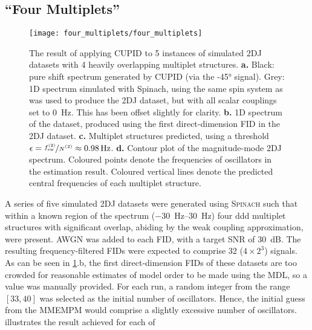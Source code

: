 \subsection{``Four Multiplets''}
\label{subsec:four-mp}
\begin{figure}
    \centering
    \texttt{[image: four\_multiplets/four\_multiplets]}
    \caption[
        The result of applying \acs{CUPID} to 5 instances of simulated
        \acs{2DJ} datasets with 4 heavily overlapping multiplet structures.
    ]{
        The result of applying \ac{CUPID} to 5 instances of simulated \ac{2DJ}
        datasets with 4 heavily overlapping multiplet structures.
        \textbf{a.} Black: pure shift spectrum generated by \ac{CUPID} (via the
        \ang{-45} signal).
        Grey: \ac{1D} spectrum simulated with Spinach, using the same spin
        system as was used to produce the \ac{2DJ} dataset, but with all scalar
        couplings set to \qty{0}{\hertz}. This has been offset slightly for
        clarity.
        \textbf{b.} \ac{1D} spectrum of the dataset, produced using the first
        direct-dimension \ac{FID} in the \ac{2DJ} dataset.
        \textbf{c.} Multiplet structures predicted, using a threshold $\epsilon
        = \nicefrac{\fswtwo}{\Ntwo} \approx \qty{0.98}{\hertz}$.
        \textbf{d.} Contour plot of the magnitude-mode \ac{2DJ} spectrum.
        Coloured points denote the frequencies of oscillators in the
        estimation result. Coloured vertical lines denote the predicted central
        frequencies of each multiplet structure.
    }
    \label{fig:four-multiplets}
\end{figure}
A series of five simulated \ac{2DJ} datasets
were generated using \textsc{Spinach} such that within a
known region of the spectrum (\SIrange{-30}{30}{\hertz}) four ddd multiplet
structures with significant overlap, abiding by the weak coupling
approximation, were present. \ac{AWGN} was added to each \ac{FID}, with a
target \ac{SNR} of \qty{30}{\deci\bel}.
The resulting frequency-filtered \acp{FID} were expected to comprise 32 ($4 \times
2^3$) signals. As can be seen in
\cref{fig:four-multiplets}.b, the first direct-dimension \acp{FID} of these
datasets are too crowded for reasonable estimates of model order to be made
using the \ac{MDL}, so a value was manually provided. For each run, a random
integer from the range $[33, 40]$ was selected as the initial number of
oscillators. Hence, the initial guess from the \ac{MMEMPM} would comprise a
slightly excessive number of oscillators.
 illustrates the result achieved for each of
